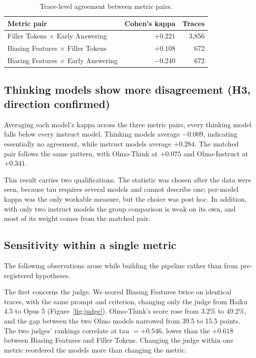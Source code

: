 \documentclass[11pt]{article}
\begin{document}
\begin{table}[h]
  \centering\small
  \caption{Trace-level agreement between metric pairs.}
  \label{tab:kappa}
  \begin{tabular}{lrr}
    \toprule
    Metric pair & Cohen's kappa & Traces \\
    \midrule
    Filler Tokens $\times$ Early Answering    & $+0.221$ & 3{,}856 \\
    Biasing Features $\times$ Filler Tokens   & $+0.108$ &    672 \\
    Biasing Features $\times$ Early Answering & $-0.240$ &    672 \\
    \bottomrule
  \end{tabular}
\end{table}

\subsection{Thinking models show more disagreement (H3, direction confirmed)}

Averaging each model's kappa across the three metric pairs, every thinking model falls below
every instruct model. Thinking models average $-0.009$, indicating essentially no agreement,
while instruct models average $+0.284$. The matched pair follows the same pattern, with
Olmo-Think at $+0.075$ and Olmo-Instruct at $+0.341$.

This result carries two qualifications. The statistic was chosen after the data were seen,
because tau requires several models and cannot describe one; per-model kappa was the only
workable measure, but the choice was post hoc. In addition, with only two instruct models the
group comparison is weak on its own, and most of its weight comes from the matched pair.

\subsection{Sensitivity within a single metric}

The following observations arose while building the pipeline rather than from pre-registered
hypotheses.

The first concerns the judge. We scored Biasing Features twice on identical traces, with the
same prompt and criterion, changing only the judge from Haiku 4.5 to Opus 5
(Figure~\ref{fig:judge}). Olmo-Think's score rose from 3.2\% to 49.2\%, and the gap between the
two Olmo models narrowed from 39.5 to 15.5 points. The two judges' rankings correlate at tau
$= +0.546$, lower than the $+0.618$ between Biasing Features and Filler Tokens. Changing the
judge within one metric reordered the models more than changing the metric.
\end{document}
